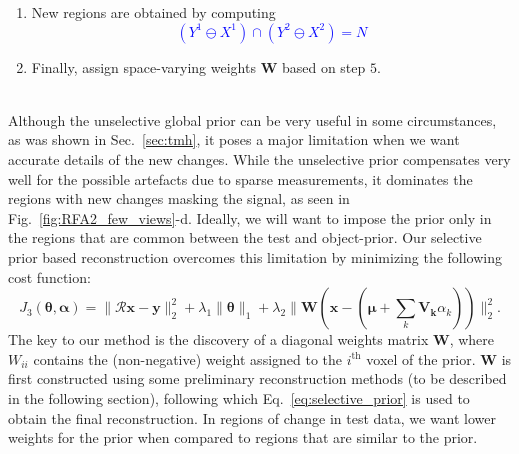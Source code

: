 \documentclass[journal]{IEEEtran}
\begin{document}
\begin{boxedminipage}{0.5\textwidth}
{\begin{enumerate}
           \textcolor{blue}{\begin{equation*}
            Y^1 \ominus X^1 = N \oplus Ar^1(N)
           \end{equation*}
\vspace{-0.5cm}
           \begin{equation*}
            Y^2 \ominus X^2 = N \oplus Ar^2(N)
           \end{equation*}}
\vspace{-0.4cm}
   \item  New regions are obtained by computing
\vspace{-0.2cm}
          \textcolor{blue}{\begin{equation*}
          (Y^1 \ominus X^1)\cap(Y^2 \ominus X^2)= N
          \end{equation*}}   
\vspace{-0.5cm}
    \item Finally, assign space-varying weights $\boldsymbol{W}$ based on step $5$.
    \end{enumerate}
\label{algo:newRegionDetection}
}
\end{boxedminipage}
\\

Although the unselective global prior can be very useful in some circumstances, as was shown in Sec.~\ref{sec:tmh}, it poses a major limitation when we want accurate details of the new changes. While the unselective prior compensates very well for the possible artefacts due to sparse measurements, it dominates the regions with new changes masking the signal, as seen in Fig.~\ref{fig:RFA2_few_views}-d. Ideally, we will want to impose the prior only in the regions that are common between the test and object-prior.  Our selective prior based reconstruction overcomes this limitation by minimizing the following cost function:
\begin{equation}
J_3(\boldsymbol{\theta},\boldsymbol{\alpha}) = \lVert\boldsymbol{\mathcal{R} x}-\boldsymbol{y}\rVert_2^2  + \lambda_1\lVert\boldsymbol{\theta}\rVert_1 +\lambda_2\lVert\boldsymbol{W}(\boldsymbol{x} - (\boldsymbol{\mu} + \sum_{k}\boldsymbol{V_k}\alpha_k))\rVert_2^2.
\label{eq:selective_prior}
\end{equation}
The key to our method is the discovery of a diagonal weights
 matrix $\boldsymbol{W}$, where $W_{ii}$ contains the (non-negative) weight assigned to the $i^{\textrm{th}}$ voxel of the prior. $\boldsymbol{W}$ is first constructed using some preliminary reconstruction methods (to be described in the following section), following which Eq.~\ref{eq:selective_prior} is used to obtain the final reconstruction. In regions of change in test data, we want lower weights for the prior when compared to regions that are similar to the prior.  
\vspace{2mm}
\end{document}
